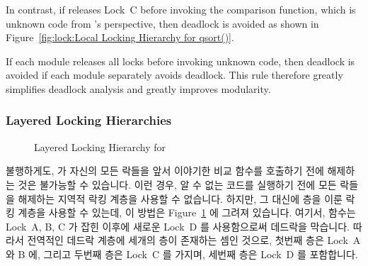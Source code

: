 In contrast, if  releases Lock~C before invoking the
comparison function, which is unknown code from 's perspective,
then deadlock is avoided as shown in
Figure~\ref{fig:lock:Local Locking Hierarchy for qsort()}.

If each module releases all locks before invoking unknown code, then
deadlock is avoided if each module separately avoids deadlock.
This rule therefore greatly simplifies deadlock analysis and greatly
improves modularity.
\fi

\subsubsection{Layered Locking Hierarchies}
\label{sec:locking:Layered Locking Hierarchies}

\begin{figure}[tb]
\centering
{}
\caption{Layered Locking Hierarchy for }
\label{fig:lock:Layered Locking Hierarchy for qsort()}
\end{figure}

불행하게도,  가 자신의 모든 락들을 앞서 이야기한 비교 함수를
호출하기 전에 해제하는 것은 불가능할 수 있습니다.
이런 경우, 알 수 없는 코드를 실행하기 전에 모든 락들을 해제하는 지역적 락킹
계층을 사용할 수 없습니다.
하지만, 그 대신에 층을 이룬 락킹 계층을 사용할 수 있는데, 이 방법은
Figure~\ref{fig:lock:Layered Locking Hierarchy for qsort()} 에 그려져 있습니다.
여기서,  함수는 Lock~A, B, C 가 잡힌 이후에 새로운 Lock~D 를
사용함으로써 데드락을 막습니다.
따라서 전역적인 데드락 계층에 세개의 층이 존재하는 셈인 것으로, 첫번째 층은
Lock~A 와 B 에, 그리고 두번째 층은 Lock~C 를 가지며, 세번째 층은 Lock~D 를
포함합니다.
\iffalse

